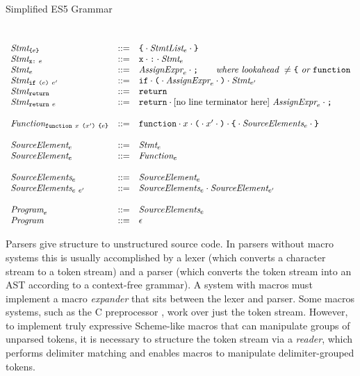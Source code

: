 \documentclass[9pt]{sigplanconf}
\begin{document}
\begin{displayfigure*}{\label{fig:grammar}Simplified ES5 Grammar}
\[\begin{array}{lcl}
  \\ \\
  \textit{Stmt}_{\texttt{\{} e \texttt{\}}} &::=& 
  \texttt{\{} \cdot \textit{StmtList}_{e}\cdot \texttt{\}}
  \\
  \textit{Stmt}_{\texttt{x}\texttt{:}~e} &::=&
  \texttt{x}\cdot \texttt{:}\cdot\textit{Stmt}_{e}
  \\
  \textit{Stmt}_{e} &::=& 
  \textit{AssignExpr}_{e} \cdot \texttt{;}
  \qquad \textit{where lookahead}~\not = 
    \texttt{\{}~\textit{or}~\texttt{function}
  \\
  \textit{Stmt}_{\texttt{if}~\texttt{(}e \texttt{)}~e'} &::=& 
  \texttt{if}\cdot 
  \texttt{(}\cdot \textit{AssignExpr}_{e} \cdot \texttt{)}\cdot \textit{Stmt}_{e'}
  \\
  \textit{Stmt}_{\texttt{return}} &::=& 
  \texttt{return}
  \\
  \textit{Stmt}_{\texttt{return}~e} &::=& 
  \texttt{return}\cdot \textrm{[no line terminator
    here]}~\textit{AssignExpr}_{e}\cdot \texttt{;}
  \\ \\
  \textit{Function}_{\texttt{function}~x~ \texttt{(}x' \texttt{)}~\texttt{\{}e \texttt{\}}} 
  &::=&
  \texttt{function} \cdot x \cdot 
  \texttt{(} \cdot x' \cdot \texttt{)}\cdot
  \texttt{\{}\cdot \textit{SourceElements}_{e} \cdot \texttt{\}}
  \\ \\
  \textit{SourceElement}_{e} &::=& \textit{Stmt}_{e} 
  \\
  \textit{SourceElement}_{e} &::=& \textit{Function}_{e}
  \\ \\

  \textit{SourceElements}_{e} &::=& \textit{SourceElement}_{e}
  \\
  \textit{SourceElements}_{e~e'} &::=&
  \textit{SourceElements}_{e}\cdot \textit{SourceElement}_{e'}
  \\ \\
  \textit{Program}_{e} &::=& \textit{SourceElements}_{e}
  \\
  \textit{Program}_{} &::=& \epsilon
\end{array}
\]  
\end{displayfigure*}

Parsers give structure to unstructured source code. In parsers without
macro systems this is usually accomplished by a lexer (which converts
a character stream to a token stream) and a parser (which converts the
token stream into an AST according to a context-free grammar). A
system with macros must implement a macro \emph{expander} that sits
between the lexer and parser. Some macros systems, such as the C
preprocessor \cite{Harbison1984}, work over just the token stream.
However, to implement truly
expressive Scheme-like macros that can manipulate groups of unparsed
tokens, it is necessary to structure the token stream via a
\emph{reader}, which performs delimiter matching and enables macros to manipulate delimiter-grouped tokens.
\end{document}
